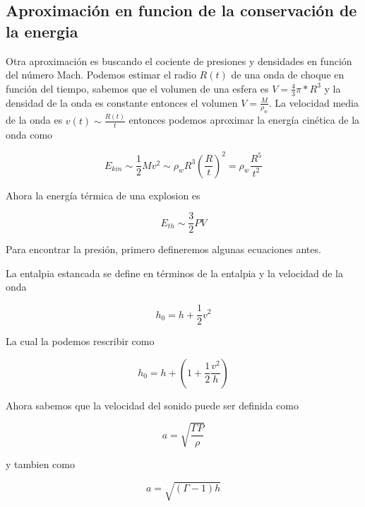 \documentclass[12pt,a4paper]{book}
\begin{document}
\subsection{Aproximación en funcion de la conservación de la energia}

Otra aproximación es buscando el cociente de presiones y densidades en función del número Mach.
Podemos estimar el radio $R(t)$ de una onda de choque en función del tiempo, sabemos que el volumen de una esfera es $V = \frac{4}{3} \pi * R^3$ y
la densidad de la onda es constante entonces el volumen $V = \frac{M}{\rho_w}$. La velocidad media de la onda es $v(t) \sim \frac{R(t)}{t} $
entonces podemos aproximar la energía cinética de la onda como 

\begin{equation}
	E_{kin} \sim \frac{1}{2} M v^2 \sim \rho_w R^3 \left( \frac{R}{t} \right) ^2 = \rho_w \frac{R^5}{t^2}
\end{equation}

Ahora la energía térmica de una explosion es 

\begin{equation} \label{eq_energia_termica}
	E_{th} \sim \frac{3}{2}PV
\end{equation}

Para encontrar la presión, primero defineremos algunas ecuaciones antes.

La entalpia estancada se define en términos de la entalpia y la velocidad de la onda 

\begin{equation}
	h_0 = h + \frac{1}{2} v^2
\end{equation}

La cual la podemos rescribir como

\begin{equation} \label{eq_entalpia}
	h_0 = h + \left( 1 +\frac{1}{2} \frac{v^2}{h} \right)
\end{equation}

Ahora sabemos que la velocidad del sonido puede ser definida como 

\begin{equation} \label{eq_sonido_1}
	a = \sqrt{\frac{\Gamma P}{\rho}}
\end{equation}

y tambien como 

\begin{equation} \label{eq_sonido_2}
	a = \sqrt{(\Gamma-1) h}
\end{equation}
\end{document}
